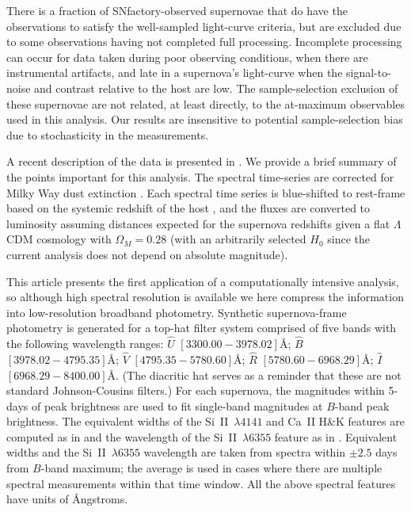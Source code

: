 \documentclass[trackchanges]{aastex62}   	%
\begin{document}
{There is a fraction of SNfactory-observed supernovae that do have the
observations to satisfy the well-sampled light-curve criteria, but are excluded due to some observations
having not completed full processing.  Incomplete processing can occur for data taken during poor
observing conditions, when there are instrumental artifacts, and late in a supernova's
light-curve when the signal-to-noise and contrast relative to the host are low.  The sample-selection exclusion of these supernovae are not related,
at least directly, to the at-maximum observables used in this analysis.  Our results are insensitive to potential sample-selection
bias due to stochasticity in the measurements.
}


A recent description of the data is presented in \citet{2015ApJ...815...58F}.
We provide a brief summary of the points important for this analysis.
The spectral time-series  are corrected for Milky Way dust
extinction \citep{1989ApJ...345..245C,1998ApJ...500..525S}.  
Each spectral time series is
blue-shifted to rest-frame
based on the systemic redshift of the host \citep[c.f.][]{2013ApJ...770..107C}, and the fluxes are converted to luminosity assuming
distances expected for the supernova redshifts given a flat
$\Lambda$CDM cosmology with $\Omega_M = 0.28$ (with an arbitrarily selected
$H_0$ since the current analysis does not depend on absolute magnitude).

This article presents the first application of a computationally intensive analysis, so although  high spectral resolution
is available we here compress the information into low-resolution broadband photometry. 
Synthetic supernova-frame photometry is generated for a top-hat filter system
comprised of five 
bands with the following wavelength ranges: ${\hat{U}}$ $[3300.00 - 3978.02]$\AA;
${\hat{B}}$ $[3978.02-4795.35]$\AA;
$\hat{V}$ $[4795.35-5780.60]$\AA;
$\hat{R}$ $[5780.60-6968.29]$\AA;
$\hat{I}$ $[6968.29-8400.00]$\AA.
(The diacritic hat serves as a reminder that these are not standard Johnson-Cousins filters.)
For each supernova, the magnitudes within 5-days of peak brightness are used to fit single-band magnitudes
at $B$-band peak brightness.
The equivalent widths of the Si~II~$\lambda 4141$ and Ca~II H\&K features are computed as
in \citet{2008A&A...477..717B} and the 
wavelength of the Si~II~$\lambda 6355$ feature
as in \citet{chotard:thesis, 2017Chotard}.
Equivalent widths and the
Si~II~$\lambda 6355$ wavelength are taken from spectra  within $\pm 2.5$ days from $B$-band maximum;
the average is used  in cases where there are multiple spectral measurements within that time window.
All the above spectral features have units of \AA ngstroms.
\end{document}
